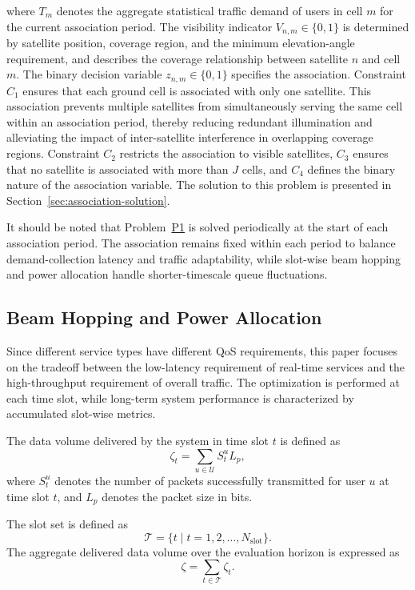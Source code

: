\documentclass[journal]{IEEEtran}
\newcommand{\revbegin}[1]{\color{revisionblue}\ignorespaces}
\newcommand{\revend}[1]{\color{black}\ignorespaces}
\begin{document}
\revbegin{}where $T_m$ denotes the aggregate statistical traffic demand of users in cell $m$ for the current association period. The visibility indicator $V_{n,m}\in\{0,1\}$ is determined by satellite position, coverage region, and the minimum elevation-angle requirement, and describes the coverage relationship between satellite $n$ and cell $m$. The binary decision variable $z_{n,m}\in\{0,1\}$ specifies the association. Constraint $C_1$ ensures that each ground cell is associated with only one satellite. This association prevents multiple satellites from simultaneously serving the same cell within an association period, thereby reducing redundant illumination and alleviating the impact of inter-satellite interference in overlapping coverage regions. Constraint $C_2$ restricts the association to visible satellites, $C_3$ ensures that no satellite is associated with more than $J$ cells, and $C_4$ defines the binary nature of the association variable. The solution to this problem is presented in Section~\ref{sec:association-solution}.\revend{}


\revbegin{}It should be noted that Problem~\hyperref[prob:p1]{P1} is solved periodically at the start of each association period. The association remains fixed within each period to balance demand-collection latency and traffic adaptability, while slot-wise beam hopping and power allocation handle shorter-timescale queue fluctuations.\revend{}

\subsection{Beam Hopping and Power Allocation}
\label{subsec:beam-hopping-formulation}
Since different service types have different QoS requirements, this paper focuses on the tradeoff between the low-latency requirement of real-time services and the high-throughput requirement of overall traffic. The optimization is performed at each time slot, while long-term system performance is characterized by accumulated slot-wise metrics.

\revbegin{}The data volume delivered by the system in time slot $t$ is defined as\revend{}
\begin{equation}
\zeta_t=
\sum_{u\in\mathcal{U}}S_t^uL_p,
\end{equation}
\revbegin{}where $S_t^u$ denotes the number of packets successfully transmitted for user $u$ at time slot $t$, and $L_p$ denotes the packet size in bits.\revend{}

The slot set is defined as 
\begin{equation}
\mathcal{T}=\{t\mid t=1,2,\ldots,N_{\mathrm{slot}}\}.
\end{equation}
\revbegin{}The aggregate delivered data volume over the evaluation horizon is expressed as\revend{}
\begin{equation}
\zeta=
\sum_{t\in\mathcal{T}}\zeta_t.
\end{equation}
\end{document}
